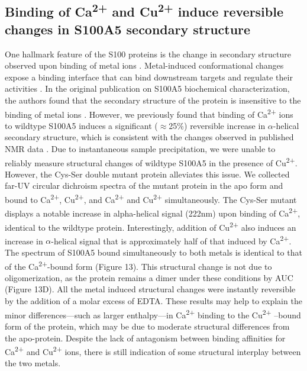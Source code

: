 \subsection{Binding of Ca\protect\textsuperscript{2+} and Cu\protect\textsuperscript{2+} 
induce reversible changes in S100A5 secondary structure}

One hallmark feature of the S100 proteins is the change in secondary
structure observed upon binding of metal ions \cite{wheeler_multiple_2016,bertini_solution_2012,sturchler_s100a16_2006}.
Metal-induced conformational changes expose a binding interface that
can bind downstream targets and regulate their activities \cite{santamaria-kisiel_calcium-dependent_2006,kim_biophysical_2017}.
In the original publication on S100A5 biochemical characterization,
the authors found that the secondary structure of the protein is insensitive
to the binding of metal ions \cite{schafer_brain_2000}. However,
we previously found that binding of Ca\textsuperscript{2+} ions to
wildtype S100A5 induces a significant ($\approx$25\%) reversible
increase in $\alpha$-helical secondary structure, which is consistent
with the changes observed in published NMR data \cite{bertini_solution_2009,kim_biophysical_2017}.
Due to instantaneous sample precipitation, we were unable to reliably
measure structural changes of wildtype S100A5 in the presence of Cu\textsuperscript{2+}.
However, the Cys-Ser double mutant protein alleviates this issue.
We collected far-UV circular dichroism spectra of the mutant protein
in the apo form and bound to Ca\textsuperscript{2+}, Cu\textsuperscript{2+},
and Ca\textsuperscript{2+} and Cu\textsuperscript{2+} simultaneously.
The Cys-Ser mutant displays a notable increase in alpha-helical signal
(222nm) upon binding of Ca\textsuperscript{2+}, identical to the
wildtype protein. Interestingly, addition of Cu\textsuperscript{2+} 
also induces an increase in $\alpha$-helical signal that is approximately
half of that induced by Ca\textsuperscript{2+}. The spectrum of S100A5
bound simultaneously to both metals is identical to that of the Ca\textsuperscript{2+}-bound
form (Figure 13). This structural change is not due to oligomerization,
as the protein remains a dimer under these conditions by AUC (Figure
13D). All the metal induced structural changes were instantly reversible
by the addition of a molar excess of EDTA. These results may help
to explain the minor differences---such as larger enthalpy---in Ca\textsuperscript{2+} binding
to the Cu\textsuperscript{2+} –bound form of the protein, which may
be due to moderate structural differences from the apo-protein. Despite
the lack of antagonism between binding affinities for Ca\textsuperscript{2+} 
and Cu\textsuperscript{2+} ions, there is still indication of some
structural interplay between the two metals.

